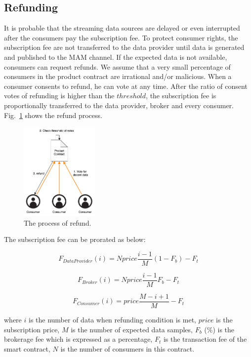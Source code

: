 \documentclass[conference]{IEEEtran}
\begin{document}
\subsection{Refunding}

It is probable that the streaming data sources are delayed or even interrupted after the consumers pay the subscription fee. To protect consumer rights, the subscription fee are not transferred to the data provider until data is generated and published to the MAM channel. If the expected data is not available, consumers can request refunds. We assume that a very small percentage of consumers in the product contract are irrational and/or malicious. When a consumer consents to refund, he can vote at any time. After the ratio of consent votes of refunding is higher than the $threshold$, the subscription fee is proportionally transferred to the data provider, broker and every consumer. Fig.~\ref{fig:refund} shows the refund process.

\begin{figure}[!t]
	\centering
	\includegraphics[width=1.5in]{refund}
	\caption{The process of refund.}
	\label{fig:refund}
\end{figure}

The subscription fee can be prorated as below:

\begin{equation}
    F_{DataProvider}(i) = N price \frac{i-1}{M} (1-F_{b}) -F_{t}
\end{equation}

\begin{equation}
    F_{Broker}(i) = N price \frac{i-1}{M} F_{b} -F_{t}
\end{equation}

\begin{equation}
    F_{Consumer}(i) = price \frac{M-i+1}{M} -F_{t}
\end{equation}

where $i$ is the number of data when refunding condition is met, $price$  is the subscription price, $M$ is the number of expected data samples, $F_{b}$ (\%) is the brokerage fee which is expressed as a percentage, $F_{t}$ is the transaction fee of the smart contract, $N$ is the number of consumers in this contract.
\end{document}
